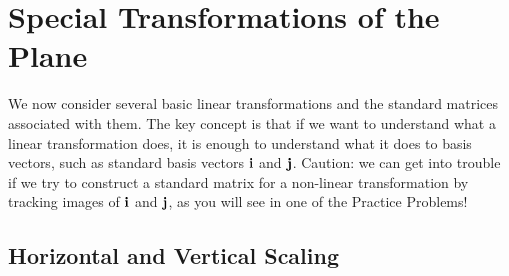 \documentclass{ximera}
\renewcommand{\vec}[1]{{\bf #1}}
\newtheorem{initprob}{Exploration Problem}
\begin{document}
\section*{Special Transformations of the Plane}
We now consider several basic linear transformations and the standard matrices associated with them.  The key concept is that if we want to understand what a linear transformation does, it is enough to understand what it does to basis vectors, such as standard basis vectors $\vec{i}$ and $\vec{j}$.  Caution: we can get into trouble if we try to construct a standard matrix for a non-linear transformation by tracking images of $\vec{i}$ and $\vec{j}$, as you will see in one of the Practice Problems!  %

\subsection*{Horizontal and Vertical Scaling} 

\end{document}

